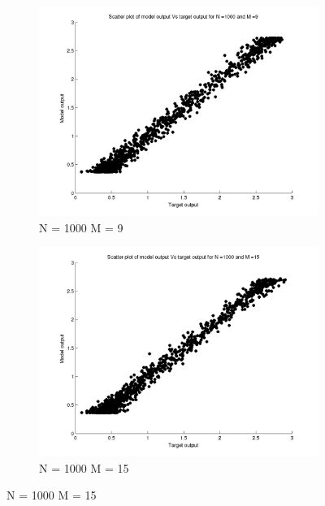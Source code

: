 \documentclass{article}
\begin{document}
\begin{figure}[H]
\begin{subfigure}{.5\textwidth}
\centering
\includegraphics[width=\linewidth]{Scatter_1/VaryingN_N1000M9}
\caption{N = 1000 M = 9}
\end{subfigure}
\begin{subfigure}{.5\textwidth}
\includegraphics[width=\linewidth]{Scatter_1/VaryingN_N1000M15}
\caption{N = 1000 M = 15}
\end{subfigure}



\end{figure}
\end{document}
